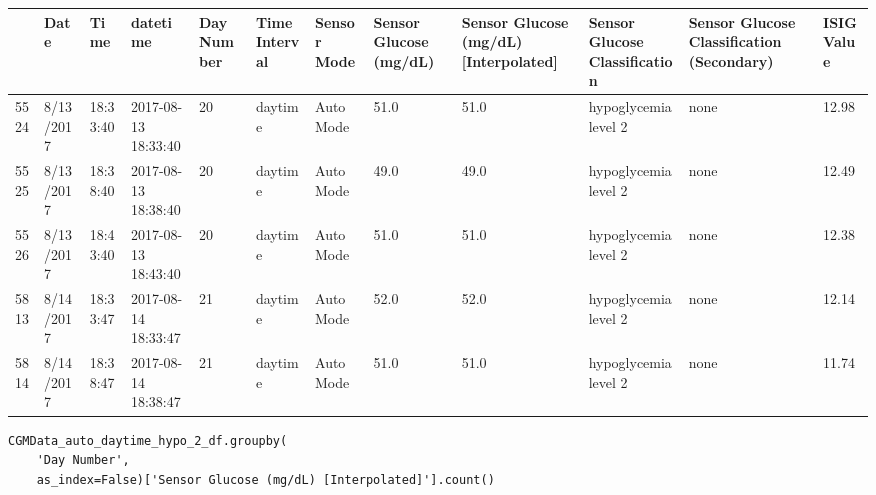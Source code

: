 \bigskip\noindent
\begin{tabular}{p{}p{}p{}p{}p{}p{}p{}p{}p{}p{}p{}p{}}
\toprule
 & Date & Time & datetime & Day Number & Time Interval & Sensor Mode & Sensor Glucose (mg/dL) & Sensor Glucose (mg/dL) [Interpolated] & Sensor Glucose Classification & Sensor Glucose Classification (Secondary) & ISIG Value \\
\hline
5524 & 8/13/2017 & 18:33:40 & 2017-08-13 18:33:40 & 20 & daytime & Auto Mode & 51.0 & 51.0 & hypoglycemia level 2 & none & 12.98 \\
\hline
5525 & 8/13/2017 & 18:38:40 & 2017-08-13 18:38:40 & 20 & daytime & Auto Mode & 49.0 & 49.0 & hypoglycemia level 2 & none & 12.49 \\
\hline
5526 & 8/13/2017 & 18:43:40 & 2017-08-13 18:43:40 & 20 & daytime & Auto Mode & 51.0 & 51.0 & hypoglycemia level 2 & none & 12.38 \\
\hline
5813 & 8/14/2017 & 18:33:47 & 2017-08-14 18:33:47 & 21 & daytime & Auto Mode & 52.0 & 52.0 & hypoglycemia level 2 & none & 12.14 \\
\hline
5814 & 8/14/2017 & 18:38:47 & 2017-08-14 18:38:47 & 21 & daytime & Auto Mode & 51.0 & 51.0 & hypoglycemia level 2 & none & 11.74 \\
\hline
\bottomrule
\end{tabular}

\bigskip

\begin{verbatim}
CGMData_auto_daytime_hypo_2_df.groupby(
    'Day Number', 
    as_index=False)['Sensor Glucose (mg/dL) [Interpolated]'].count()
\end{verbatim}

